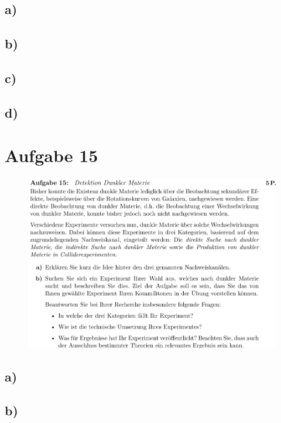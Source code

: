 \subsection{a)}


\subsection{b)}

\subsection{c)}

\subsection{d)}

\section{Aufgabe 15}

    \begin{figure}[H]
        \centering
        \includegraphics[width=\textwidth]{images/Aufgabe15.jpg}
        \label{fig:4}
    \end{figure}

\subsection{a)}

\subsection{b)}

